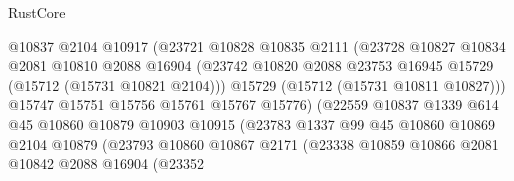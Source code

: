 \begin{lexlean}{RustCore}
\begin{coremodule}
                                  @10837
                                  @2104
                                  @10917
                                  (@23721
                                    @10828
                                    @10835
                                    @2111
                                    (@23728
                                      @10827
                                      @10834
                                      @2081
                                      @10810
                                      @2088
                                      @16904
                                      (@23742
                                        @10820
                                        @2088
                                        @23753
                                        @16945
                                        @15729
                                        (@15712 (@15731 @10821 @2104)))
                                      @15729
                                      (@15712 (@15731 @10811 @10827)))
                                    @15747
                                    @15751
                                    @15756
                                    @15761
                                    @15767
                                    @15776)
                                  (@22559
                                    @10837
                                    @1339
                                    @614
                                    @45
                                    @10860
                                    @10879
                                    @10903
                                    @10915
                                    (@23783
                                      @1337
                                      @99
                                      @45
                                      @10860
                                      @10869
                                      @2104
                                      @10879
                                      (@23793
                                        @10860
                                        @10867
                                        @2171
                                        (@23338
                                          @10859
                                          @10866
                                          @2081
                                          @10842
                                          @2088
                                          @16904
                                          (@23352

\end{coremodule}
\end{lexlean}

